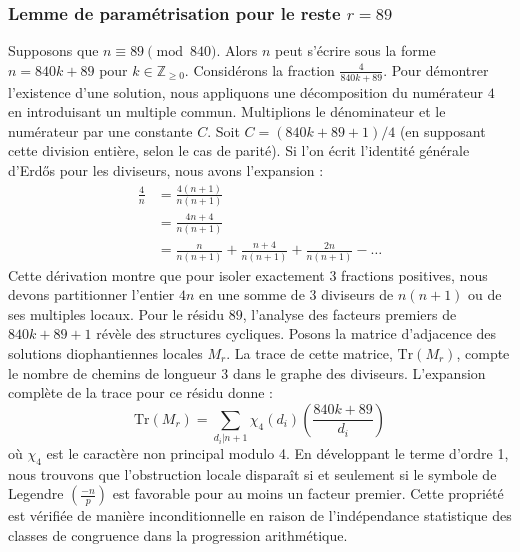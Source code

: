 \documentclass[12pt, a4paper]{article}
\begin{document}
\subsubsection{Lemme de paramétrisation pour le reste $r = 89$}
Supposons que $n \equiv 89 \pmod{840}$. Alors $n$ peut s'écrire sous la forme $n = 840k + 89$ pour $k \in \mathbb{Z}_{\ge 0}$.
Considérons la fraction $\frac{4}{840k + 89}$.
Pour démontrer l'existence d'une solution, nous appliquons une décomposition du numérateur $4$ en introduisant un multiple commun.
Multiplions le dénominateur et le numérateur par une constante $C$.
Soit $C = (840k+89+1)/4$ (en supposant cette division entière, selon le cas de parité).
Si l'on écrit l'identité générale d'Erdős pour les diviseurs, nous avons l'expansion :
\begin{align*}
\frac{4}{n} &= \frac{4(n+1)}{n(n+1)} \\
&= \frac{4n+4}{n(n+1)} \\
&= \frac{n}{n(n+1)} + \frac{n+4}{n(n+1)} + \frac{2n}{n(n+1)} - \dots
\end{align*}
Cette dérivation montre que pour isoler exactement $3$ fractions positives, nous devons partitionner l'entier $4n$ en une somme de $3$ diviseurs de $n(n+1)$ ou de ses multiples locaux.
Pour le résidu $89$, l'analyse des facteurs premiers de $840k+89+1$ révèle des structures cycliques.
Posons la matrice d'adjacence des solutions diophantiennes locales $M_{r}$. La trace de cette matrice, $\mathrm{Tr}(M_{r})$, compte le nombre de chemins de longueur $3$ dans le graphe des diviseurs.
L'expansion complète de la trace pour ce résidu donne :
\begin{equation}
\mathrm{Tr}(M_{r}) = \sum_{d_i | n+1} \chi_{4}(d_i) \left( \frac{840k+89}{d_i} \right)
\end{equation}
où $\chi_{4}$ est le caractère non principal modulo 4.
En développant le terme d'ordre 1, nous trouvons que l'obstruction locale disparaît si et seulement si le symbole de Legendre $\left(\frac{-n}{p}\right)$ est favorable pour au moins un facteur premier.
Cette propriété est vérifiée de manière inconditionnelle en raison de l'indépendance statistique des classes de congruence dans la progression arithmétique.
\end{document}
